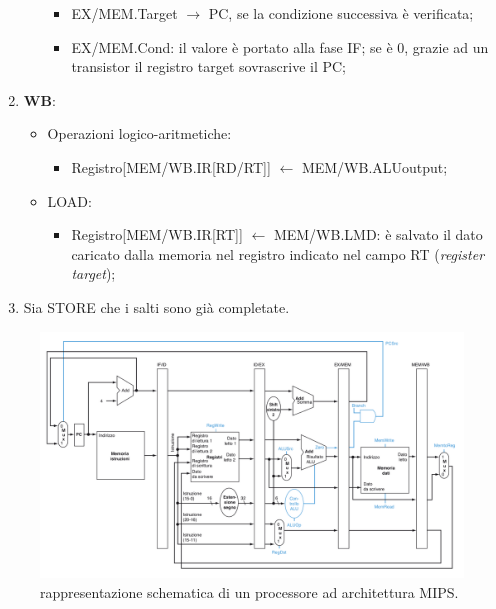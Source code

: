 \documentclass{article}
\begin{document}
\begin{enumerate}
\begin{itemize}
\begin{itemize}
				 \item EX/MEM.Target $\rightarrow$ PC, se la condizione successiva è verificata;

				 \item EX/MEM.Cond: il valore è portato alla fase IF; se è 0, grazie ad un transistor il registro target sovrascrive il PC;
			  \end{itemize}
		\end{itemize}

	\item \textbf{WB}:
		\begin{itemize}
			\item Operazioni logico-aritmetiche:
				\begin{itemize}
					\item Registro[MEM/WB.IR[RD/RT]] $\leftarrow$ MEM/WB.ALUoutput;
				\end{itemize}

			\item LOAD:
				\begin{itemize}
					\item Registro[MEM/WB.IR[RT]] $\leftarrow$ MEM/WB.LMD: è salvato il dato caricato dalla memoria nel registro indicato nel campo RT (\textit{register target});
				\end{itemize}
		\end{itemize}

		\item Sia STORE che i salti sono già completate.
\end{enumerate}

\begin{figure}[h]
	\centering
	\includegraphics[scale=0.2]{immagini/hardwaremips}
	\caption{rappresentazione schematica di un processore ad architettura MIPS.}
	\label{hardwaremips}
\end{figure}
\end{document}
